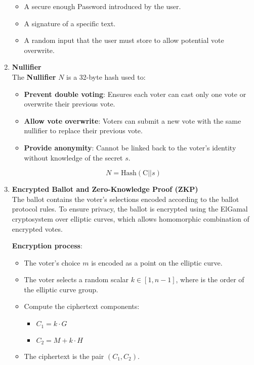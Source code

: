 \begin{enumerate}
	\begin{itemize}
		\item A secure enough Password introduced by the user.
		\item A signature of a specific text.
		\item A random input that the user must store to allow potential vote overwrite.\\
	\end{itemize}
	
	\item \textbf{Nullifier} \\
	
	The \textbf{Nullifier} $N$ is a 32-byte hash used to:
	
	\begin{itemize}
		\item \textbf{Prevent double voting}: Ensures each voter can cast only one vote or overwrite their previous vote.
		\item \textbf{Allow vote overwrite}: Voters can submit a new vote with the same nullifier to replace their previous vote.
		\item \textbf{Provide anonymity}: Cannot be linked back to the voter's identity without knowledge of the secret $s$.
	\end{itemize}
	
	$$ N = \text{Hash}(\text{C} || s) $$ 
	
	\item \textbf{Encrypted Ballot and Zero-Knowledge Proof (ZKP)} \\
	
	The ballot contains the voter's selections encoded according to the ballot protocol rules. To ensure privacy, the ballot is encrypted using the ElGamal cryptosystem over elliptic curves, which allows homomorphic combination of encrypted votes.
	
	\textbf{Encryption process}:
	
	\begin{itemize}
		\item The voter's choice $m$ is encoded as a point on the elliptic curve.
		\item The voter selects a random scalar $k \in [1, n-1]$, where is the order of the elliptic curve group.
		\item Compute the ciphertext components:
		\begin{itemize}
			\item $C_1 = k \cdot G$
			\item $C_2 = M + k \cdot H$
		\end{itemize}
		\item The ciphertext is the pair $(C_1, C_2)$.
	\end{itemize}
	

\end{enumerate}
